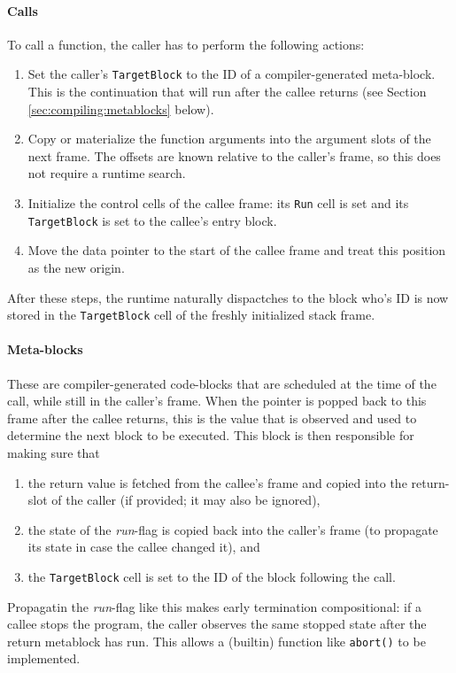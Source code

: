 \paragraph{Calls} To call a function, the caller has to perform the following actions:
\begin{enumerate}
\item Set the caller's \texttt{TargetBlock} to the ID of a compiler-generated meta-block. This is the continuation that will run after the callee returns (see Section \ref{sec:compiling:metablocks} below).
\item Copy or materialize the function arguments into the argument slots of the next frame. The offsets are known relative to the caller's frame, so this does not require a runtime search.
\item Initialize the control cells of the callee frame: its \texttt{Run} cell is set and its \texttt{TargetBlock} is set to the callee's entry block.
\item Move the data pointer to the start of the callee frame and treat this position as the new origin.
\end{enumerate}
After these steps, the runtime naturally dispactches to the block who's ID is now stored in the \texttt{TargetBlock} cell of the freshly initialized stack frame.

\paragraph{Meta-blocks} These are compiler-generated code-blocks that are scheduled at the time of the call, while still in the caller's frame. When the pointer is popped back to this frame after the callee returns, this is the value that is observed and used to determine the next block to be executed. This block is then responsible for making sure that
\begin{enumerate}
\item the return value is fetched from the callee's frame and copied into the return-slot of the caller (if provided; it may also be ignored),
\item the state of the \emph{run}-flag is copied back into the caller's frame (to propagate its state in case the callee changed it), and 
\item the \texttt{TargetBlock} cell is set to the ID of the block following the call.
\end{enumerate}

Propagatin the \emph{run}-flag like this makes early termination compositional: if a callee stops the program, the caller observes the same stopped state after the return metablock has run. This allows a (builtin) function like \texttt{abort()} to be implemented.

